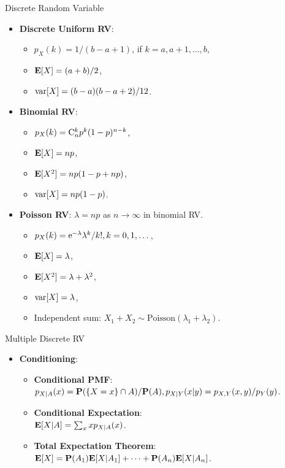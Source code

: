 \documentclass[landscape,a4paper]{article}
\begin{document}
\begin{cheatsheetcolumns}
\begin{card}{Discrete Random Variable}
\begin{itemize}
\begin{itemize}
\begin{itemize}
					\end{itemize}
					\item \textbf{Discrete Uniform RV}:
					\begin{itemize}
						\item $p_X(k)=1/(b-a+1)$, if $k=a,a+1,\dots,b$,
						\item $\mathbf{E}[X]=(a+b)/2$,
						\item $\operatorname{var}[X]=(b-a)(b-a+2)/12$.
					\end{itemize}
					\item \textbf{Binomial RV}:
					\begin{itemize}
						\item $p_X(k)=\mathrm{C}_{n}^{k}p^k(1-p)^{n-k}$,
						\item $\mathbf{E}[X]=np$,
						\item $\mathbf{E}[X^2]=np(1-p+np)$,
						\item $\operatorname{var}[X]=np(1-p)$.
					\end{itemize}
					\item \textbf{Poisson RV}: $\lambda=np$ as $n\to\infty$ in binomial RV.
					\begin{itemize}
						\item $p_X(k)=\mathrm{e}^{-\lambda}\lambda^k/k!,k=0,1,\dots$,
						\item $\mathbf{E}[X]=\lambda$,
						\item $\mathbf{E}[X^2]=\lambda+\lambda^2$,
						\item $\operatorname{var}[X]=\lambda$,
						\item Independent sum: $X_1+X_2\sim\text{Poisson}(\lambda_1+\lambda_2)$.
					\end{itemize}
				\end{itemize}
				\end{itemize}
			\end{card}
			\begin{card}{Multiple Discrete RV}
				\begin{itemize}
					\item \textbf{Conditioning}:
					\begin{itemize}
						\item \textbf{Conditional PMF}:\\ $p_{X|A}(x)=\mathbf{P}(\{X=x\}\cap A)/\mathbf{P}(A),p_{X|Y}(x|y)=p_{X,Y}(x,y)/p_Y(y)$.
						\item \textbf{Conditional Expectation}:\\ $\mathbf{E}[X|A]=\sum_x xp_{X|A}(x)$.
						\item \textbf{Total Expectation Theorem}:\\ $\mathbf{E}[X]=\mathbf{P}(A_1)\mathbf{E}[X|A_1]+\dots +\mathbf{P}(A_n)\mathbf{E}[X|A_n]$.

\end{itemize}
\end{itemize}
\end{card}
\end{cheatsheetcolumns}
\end{document}
